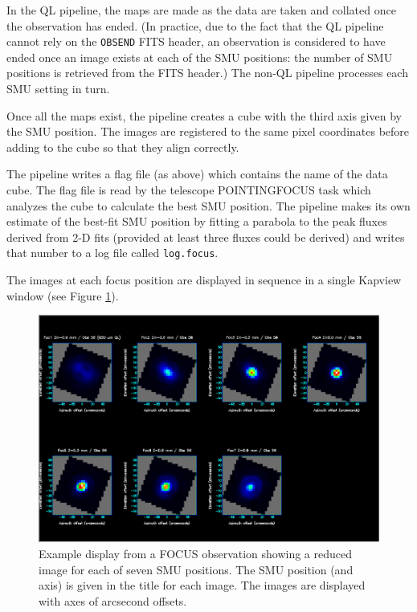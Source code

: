\documentclass[twoside,11pt]{article}
\renewcommand{\_}{\texttt{\symbol{95}}}
\begin{document}
In the QL pipeline, the maps are made as the data are taken and
collated once the observation has ended. (In practice, due to the fact
that the QL pipeline cannot rely on the \verb+OBSEND+ FITS header, an
observation is considered to have ended once an image exists at each
of the SMU positions: the number of SMU positions is retrieved from
the FITS header.) The non-QL pipeline processes each SMU setting in
turn.

Once all the maps exist, the pipeline creates a cube with the third
axis given by the SMU position. The images are registered to the same
pixel coordinates before adding to the cube so that they align
correctly.

The pipeline writes a flag file (as above) which contains the name of
the data cube. The flag file is read by the telescope POINTING\_FOCUS
task which analyzes the cube to calculate the best SMU position. The
pipeline makes its own estimate of the best-fit SMU position by
fitting a parabola to the peak fluxes derived from 2-D fits (provided
at least three fluxes could be derived) and writes that number to a
log file called \verb+log.focus+.

The images at each focus position are displayed in sequence in a
single Kapview window (see Figure \ref{fig:focus}).

\begin{figure}[t]
\centering
\includegraphics[width=\textwidth]{sun264_focus.eps}
\caption{Example display from a FOCUS observation showing a reduced
  image for each of seven SMU positions. The SMU position (and axis)
  is given in the title for each image. The images are displayed with
  axes of arcsecond offsets.\label{fig:focus}}
\end{figure}
\end{document}
